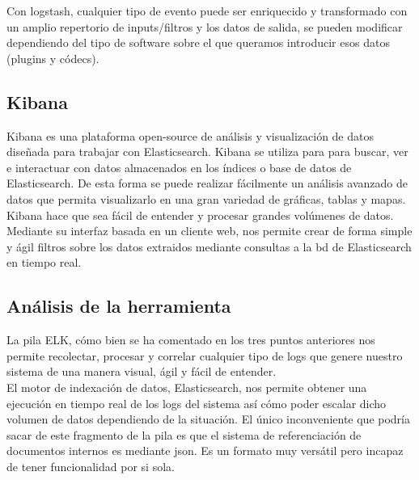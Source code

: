 Con logstash, cualquier tipo de evento puede ser enriquecido y transformado con un amplio repertorio de inputs/filtros y los datos de salida, se pueden modificar dependiendo del tipo de software sobre el que queramos introducir esos datos (plugins y códecs).\\

\subsection{Kibana}
Kibana es una plataforma open-source de análisis y visualización de datos diseñada para trabajar con Elasticsearch. Kibana se utiliza para para buscar, ver e interactuar con datos almacenados en los índices o base de datos de Elasticsearch. De esta forma se puede realizar fácilmente un análisis avanzado de datos que permita visualizarlo en una gran variedad de gráficas, tablas y mapas.\\

Kibana hace que sea fácil de entender y procesar grandes volúmenes de datos. Mediante su interfaz basada en un cliente web, nos permite crear de forma simple y ágil filtros sobre los datos extraidos mediante consultas a la bd de Elasticsearch en tiempo real.\\


\subsection{Análisis de la herramienta}

La pila ELK, cómo bien se ha comentado en los tres puntos anteriores nos permite recolectar, procesar y correlar cualquier tipo de logs que genere nuestro sistema de una manera visual, ágil y fácil de entender. \\

El motor de indexación de datos, Elasticsearch, nos permite obtener una ejecución en tiempo real de los logs del sistema así cómo poder escalar dicho volumen de datos dependiendo de la situación. El único inconveniente que podría sacar de este fragmento de la pila es que el sistema de referenciación de documentos internos es mediante json. Es un formato muy versátil pero incapaz de tener funcionalidad por si sola.\\

